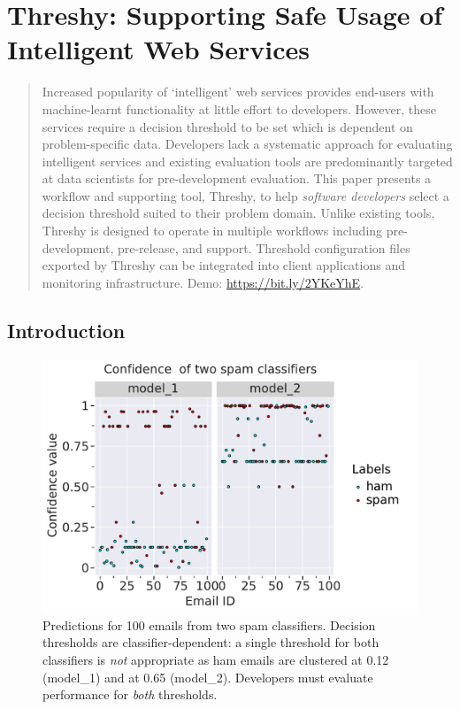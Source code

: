 \chapter[Supporting Safe Usage of Intelligent Web Services]
{Threshy: Supporting Safe Usage of Intelligent Web Services}
\label{ch:icse-demo2020}
\graphicspath{{mainmatter/publications/figures/icse-demo2020/}}

\def\demolink{https://bit.ly/2YKeYhE}

\begin{abstract}
Increased popularity of `intelligent' web services provides end-users with machine-learnt functionality at little effort to developers. However, these services require a decision threshold to be set which is dependent on problem-specific data. Developers lack a systematic approach for evaluating intelligent services and existing evaluation tools are predominantly targeted at data scientists for pre-development evaluation. This paper presents a workflow and supporting tool, Threshy, to help \textit{software developers} select a decision threshold suited to their problem domain. Unlike existing tools, Threshy is designed to operate in multiple workflows including pre-development, pre-release, and support. Threshold configuration files exported by Threshy can be integrated into client applications and monitoring infrastructure. 
Demo: \url{\demolink}.
\end{abstract}

\section{Introduction}

\begin{figure}[t]
    \centering
    \includegraphics[width=.7\linewidth]{scatter}
    \caption{Predictions for 100 emails from two spam classifiers. Decision thresholds are classifier-dependent:  a single threshold for both classifiers is \textit{not} appropriate as ham emails are clustered at 0.12 (model\_1) and at 0.65 (model\_2). Developers must evaluate  performance for \textit{both} thresholds.}
    \label{icse-demo2020:fig:example}
\end{figure}

